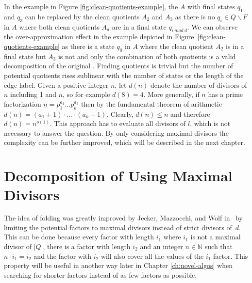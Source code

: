 In the example in Figure \ref{fig:clean-quotients-example}, the \DFA $A$ with final states $q_1$ and $q_3$ can be replaced by the clean quotients $A_2$ and $A_3$ as there is no $q_i \in Q \backslash F$ in $A$ where both clean quotients $A_d$ are in a final state $q_{i ~mod~ d}$.
We can observe the over-approximation effect in the example depicted in Figure~\ref{fig:clean-quotients-example} as there is a state $q_0$ in $A$ where the clean quotient $A_2$ is in a final state but $A_3$ is not and only the combination of both quotients is a valid decomposition of the original \DFA.
Finding quotients is trivial but the number of potential quotients rises sublinear with the number of states or the length of the edge label.
Given a positive integer $n$, let $d(n)$ denote the number of divisors of $n$ including 1 and $n$, so for example $d(8)=4$.
More generally, if $n$ has a prime factorization $n = p_1^{a_1} \ldots p_k^{a_k}$ then by the fundamental theorem of arithmetic $d(n) = (a_1+1) \cdot \ldots \cdot (a_k+1)$.
Clearly, $d(n) \leq n$ and therefore $d(n) = n^{o(1)}$.
This approach has to evaluate all divisors of $l$, which is not necessary to answer the {} question.
By only considering maximal divisors the complexity can be further improved, which will be described in the next chapter.

\section{Decomposition of \DFAs Using Maximal Divisors}
\label{ch:analysis:max-divisors}
The idea of folding \DFAs was greatly improved by Jecker, Mazzocchi, and Wolf in~\cite{DBLP:journals/corr/abs-2107-04683} by limiting the potential factors to maximal divisors instead of strict divisors of~$d$.
This can be done because every factor with length $i_1$ where $i_1$ is not a maximal divisor of $|Q|$, there is a factor with length $i_2$ and an integer $n \in \mathbb{N}$ such that $n \cdot i_1 = i_2$ and the factor with $i_2$ will also cover all the values of the $i_1$ factor.
This property will be useful in another way later in Chapter \ref{ch:novel-algos} when searching for shorter factors instead of as few factors as possible.

